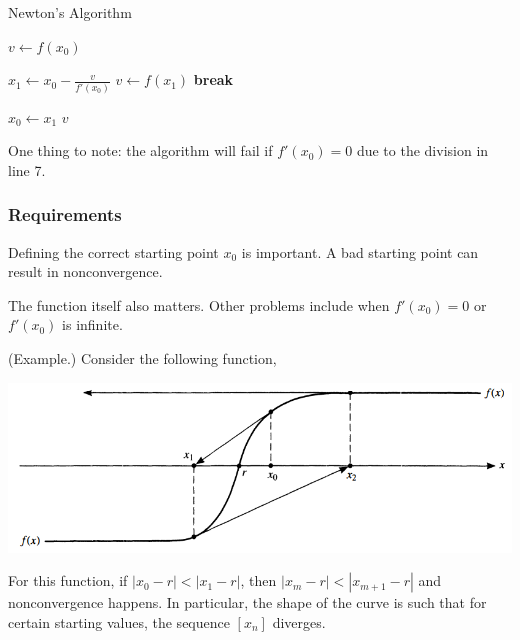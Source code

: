 \documentclass[letterpaper]{article}
\begin{document}
\begin{algorithm}[H]
    \caption{Newton's Algorithm}
    \label{alg:two}
    \begin{algorithmic}[1]
            \State $v \gets f(x_0)$
                \State \Return 
            \EndIf

                \State $x_1 \gets x_0 - \frac{v}{f'(x_0)}$
                \State $v \gets f(x_1)$
                    \State \textbf{break}
                \EndIf

                \State $x_0 \gets x_1$
            \EndFor 
            \State \Return $v$
        \EndFunction
    \end{algorithmic}
\end{algorithm}
One thing to note: the algorithm will fail if $f'(x_0) = 0$ due to the division in line 7. 

\subsubsection{Requirements}
Defining the correct starting point $x_0$ is important. A bad starting point can result in nonconvergence.

\bigskip 

The function itself also matters. Other problems include when $f'(x_0) = 0$ or $f'(x_0)$ is infinite.

\begin{mdframed}
    (Example.) Consider the following function, 

    \begin{center}
        \includegraphics[scale=0.6]{../assets/newton_bad.png}
    \end{center}
    For this function, if $|x_0 - r| < |x_1 - r|$, then $|x_m - r| < |x_{m + 1} - r|$ and nonconvergence happens. In particular, the shape of the curve is such that for certain starting values, the sequence $[x_n]$ diverges.
\end{mdframed}
\end{document}

